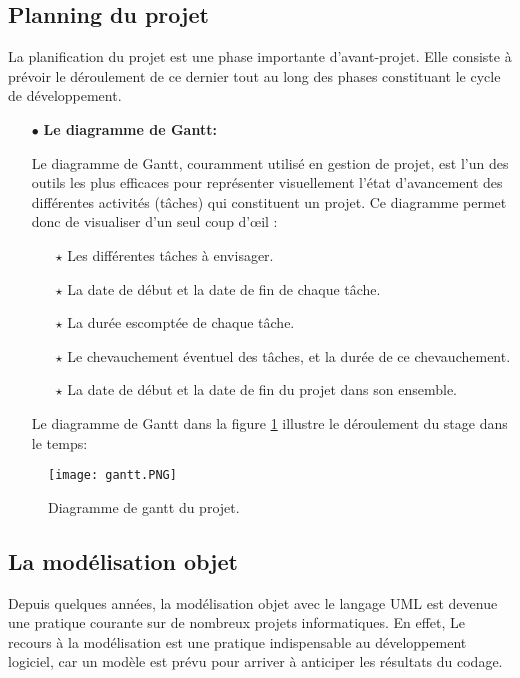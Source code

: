 \subsection{Planning du projet}

La planification du projet est une phase importante d’avant-projet. Elle consiste à prévoir le déroulement de ce dernier tout au long des phases constituant le cycle de développement.

\medskip
\begin{itemize}
\item[$\bullet$] \textbf{Le diagramme de Gantt:}

Le diagramme de Gantt, couramment utilisé en gestion de projet, est l'un des outils les plus
efficaces pour représenter visuellement l'état d'avancement des différentes activités (tâches) qui constituent un projet.
Ce diagramme permet donc de visualiser d'un seul coup d'œil :
  \begin{itemize}
	\item[$\star$]Les différentes tâches à envisager. 
	\item[$\star$]La date de début et la date de fin de chaque tâche.
	\item[$\star$] La durée escomptée de chaque tâche. 
	\item[$\star$] Le chevauchement éventuel des tâches, et la durée de ce chevauchement.
	\item[$\star$] La date de début et la date de fin du projet dans son ensemble.
\end{itemize}





















Le diagramme de Gantt dans la figure \ref{fig:gantt} illustre le déroulement du stage dans le temps:
\end{itemize}

%
\begin{figure}[ht]
  \centering
  \texttt{[image: gantt.PNG]}
  \caption{Diagramme de gantt du projet.}
  \label{fig:gantt}
\end{figure}
\clearpage
\FloatBarrier
\subsection{La modélisation objet}
Depuis quelques années, la modélisation objet avec le langage UML est devenue une pratique
courante sur de nombreux projets informatiques. En effet, Le recours à la modélisation est
une pratique indispensable au développement logiciel, car un modèle est prévu pour arriver à
anticiper les résultats du codage.
